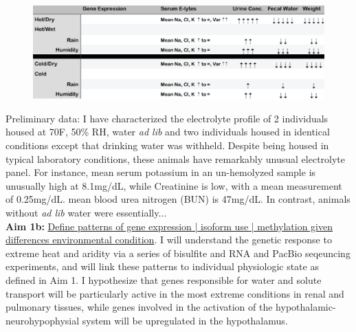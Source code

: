 \documentclass[11pt]{article}
\begin{document}
\begin{figure}
\hypertarget{Table 1}{}
\vspace{-5mm}
\begin{mdframed}
  \begin{center}
    \includegraphics[width=1\textwidth]{Aim1-table.eps}
  \end{center}
\end{mdframed}
\end{figure}


%
%


Preliminary data: I have characterized the electrolyte profile of 2 individuals housed at 70F, 50\% RH, water \textit{ad lib} and two individuals housed in identical conditions except that drinking water was withheld. Despite being housed in typical laboratory conditions, these animals have remarkably unusual electrolyte panel. For instance, mean serum potassium in an un-hemolyzed sample is unusually high at 8.1mg/dL, while Creatinine is low, with a mean measurement of 0.25mg/dL. mean blood urea nitrogen (BUN) is 47mg/dL. In contrast, animals without \textit{ad lib} water were essentially... \\  

\noindent \textbf{Aim 1b:} \ul{Define patterns of gene expression | isoform use | methylation given differences environmental condition}. {I will understand the genetic response to extreme heat and aridity via a series of bisulfite and RNA and PacBio seqeuncing experiments, and will link these patterns to individual physiologic state as defined in Aim 1.} I hypothesize that genes responsible for water and solute transport will be particularly active in the most extreme conditions in renal and pulmonary tissues, while genes involved in the activation of the hypothalamic-neurohypophysial system will be upregulated in the hypothalamus.\\
\end{document}
